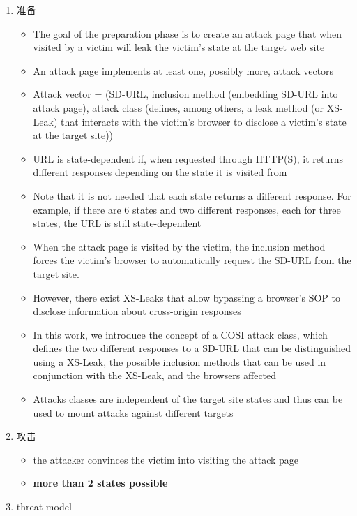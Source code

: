 \begin{enumerate}
    \item 准备
    \begin{itemize}
        \item The goal of the preparation phase is to create an attack page that when visited by a victim will leak the victim’s state at the target web site
        \item An attack page implements at least one, possibly more, attack vectors
        \item Attack vector = (SD-URL, inclusion method (embedding SD-URL into attack page), attack class (defines, among others, a leak
        method (or XS-Leak) that interacts with the victim’s browser to disclose a victim’s state at the target site))
        \item URL is state-dependent if, when requested through HTTP(S), it returns different responses depending on the state it is visited from
        \item Note that it is not needed that
        each state returns a different response. For example, if there
        are 6 states and two different responses, each for three states,
        the URL is still state-dependent
        \item When the attack page is visited by the
        victim, the inclusion method forces the victim’s browser to
        automatically request the SD-URL from the target site.
        \item However, there exist XS-Leaks that allow bypassing a browser’s SOP to disclose information about cross-origin responses
        \item In this work, we introduce
        the concept of a COSI attack class, which defines the two different responses to a SD-URL that can be distinguished using a XS-Leak, the possible inclusion methods that can be used in conjunction with the XS-Leak, and the browsers affected
        \item Attacks classes are independent of the target site states and thus can be used to mount attacks against different targets
    \end{itemize}
    \item 攻击
    \begin{itemize}
        \item the attacker convinces the victim into visiting the attack page
        \item \textbf{more than 2 states possible}
    \end{itemize}
    \item threat model

\end{enumerate}
